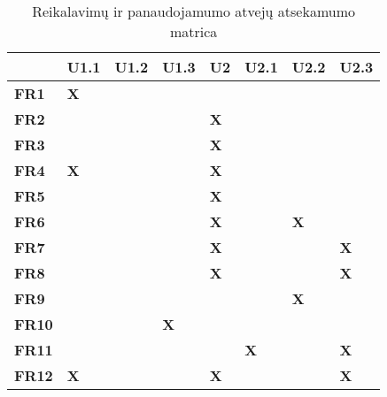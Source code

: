 \begin{table}[ht]
  \centering
  \caption{Reikalavimų ir panaudojamumo atvejų atsekamumo matrica}
    \begin{tabular}{|l|r|r|r|r|r|r|r|}
    \hline
          & \multicolumn{1}{l|}{\textbf{U1.1}} & \multicolumn{1}{l|}{\textbf{U1.2}} & \multicolumn{1}{l|}{\textbf{U1.3}} & \multicolumn{1}{l|}{\textbf{U2}} & \multicolumn{1}{l|}{\textbf{U2.1}} & \multicolumn{1}{l|}{\textbf{U2.2}} & \multicolumn{1}{l|}{\textbf{U2.3}} \bigstrut\\
    \hline
    \textbf{FR1} & \multicolumn{1}{l|}{\textbf{X}} &       &       &       &       &       &  \bigstrut\\
    \hline
    \textbf{FR2} &       &       &       & \multicolumn{1}{l|}{\textbf{X}} &       &       &  \bigstrut\\
    \hline
    \textbf{FR3} &       &       &       & \multicolumn{1}{l|}{\textbf{X}} &       &       &  \bigstrut\\
    \hline
    \textbf{FR4} & \multicolumn{1}{l|}{\textbf{X}} &       &       & \multicolumn{1}{l|}{\textbf{X}} &       &       &  \bigstrut\\
    \hline
    \textbf{FR5} &       &       &       & \multicolumn{1}{l|}{\textbf{X}} &       &       &  \bigstrut\\
    \hline
    \textbf{FR6} &       &       &       & \multicolumn{1}{l|}{\textbf{X}} &       & \multicolumn{1}{l|}{\textbf{X}} &  \bigstrut\\
    \hline
    \textbf{FR7} &       &       &       & \multicolumn{1}{l|}{\textbf{X}} &       &       & \multicolumn{1}{l|}{\textbf{X}} \bigstrut\\
    \hline
    \textbf{FR8} &       &       &       & \multicolumn{1}{l|}{\textbf{X}} &       &       & \multicolumn{1}{l|}{\textbf{X}} \bigstrut\\
    \hline
    \textbf{FR9} &       &       &       &       &       & \multicolumn{1}{l|}{\textbf{X}} &  \bigstrut\\
    \hline
    \textbf{FR10} &       &       & \multicolumn{1}{l|}{\textbf{X}} &       &       &       &  \bigstrut\\
    \hline
    \textbf{FR11} &       &       &       &       & \multicolumn{1}{l|}{\textbf{X}} &       & \multicolumn{1}{l|}{\textbf{X}} \bigstrut\\
    \hline
    \textbf{FR12} & \multicolumn{1}{l|}{\textbf{X}} &       &       & \multicolumn{1}{l|}{\textbf{X}} &       &       & \multicolumn{1}{l|}{\textbf{X}} \bigstrut\\

\end{tabular}
\end{table}
